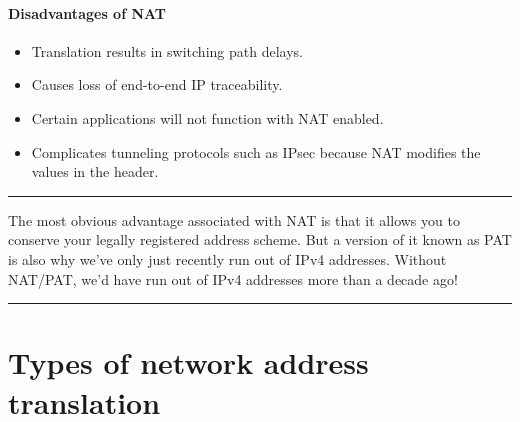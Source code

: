 \documentclass[b5paper,11pt]{memoir}
\begin{document}
\paragraph{Disadvantages of NAT}
\begin{itemize}
   \item Translation results in switching path delays.
   \item Causes loss of end-to-end IP traceability.
   \item Certain applications will not function with NAT enabled.
   \item Complicates tunneling protocols such as IPsec because NAT modifies the values in the header.
\end{itemize}


\begin{center}\rule{0.5\linewidth}{0.5pt}\end{center}

The most obvious advantage associated with NAT is that it allows you to conserve your legally registered address scheme.
But a version of it known as PAT is also why we've only just recently run out of IPv4 addresses.
Without NAT/PAT, we'd have run out of IPv4 addresses more than a decade ago!

\begin{center}\rule{0.5\linewidth}{0.5pt}\end{center}



\section{Types of network address translation}
\end{document}
